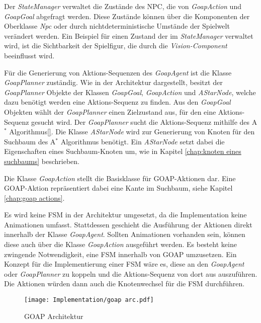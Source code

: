 Der \textit{StateManager} verwaltet die Zustände des NPC, die von \textit{GoapAction} und \textit{GoapGoal} abgefragt werden. Diese Zustände können über die Komponenten der Oberklasse \textit{Npc} oder durch nichtdeterministische Umstände der Spielwelt verändert werden. Ein Beispiel für einen Zustand der im \textit{StateManager} verwaltet wird, ist die Sichtbarkeit der Spielfigur, die durch die \textit{Vision-Component} beeinflusst wird.

Für die Generierung von Aktions-Sequenzen des \textit{GoapAgent} ist die Klasse \textit{GoapPlanner} zuständig. Wie in der Architektur dargestellt, besitzt der \textit{GoapPlanner} Objekte der Klassen \textit{GoapGoal}, \textit{GoapAction} und \textit{AStarNode}, welche dazu benötigt werden eine Aktions-Sequenz zu finden. Aus den \textit{GoapGoal} Objekten wählt der \textit{GoapPlanner} einen Zielzustand aus, für den eine Aktions-Sequenz gesucht wird. Der \textit{GoapPlanner} sucht die Aktions-Sequenz mithilfe des A$^*$ Algorithmus\ref{}. Die Klasse \textit{AStarNode} wird zur Generierung von Knoten für den Suchbaum des A$^*$ Algorithmus benötigt. Ein \textit{AStarNode} setzt dabei die Eigenschaften eines Suchbaum-Knoten um, wie in Kapitel \ref{chap:knoten eines suchbaums} beschrieben.

Die Klasse \textit{GoapAction} stellt die Basisklasse für GOAP-Aktionen dar. Eine GOAP-Aktion repräsentiert dabei eine Kante im Suchbaum, siehe Kapitel \ref{chap:goap actions}.

Es wird keine FSM in der Architektur umgesetzt, da die Implementation keine Animationen umfasst. Stattdessen geschieht die Ausführung der Aktionen direkt innerhalb der Klasse \textit{GoapAgent}. Sollten Animationen vorhanden sein, können diese auch über die Klasse \textit{GoapAction} ausgeführt werden. Es besteht keine zwingende Notwendigkeit, eine FSM innerhalb von GOAP umzusetzen. Ein Konzept für die Implementierung einer FSM wäre es, diese an den \textit{GoapAgent} oder \textit{GoapPlanner} zu koppeln und die Aktions-Sequenz von dort aus auszuführen. Die Aktionen würden dann auch die Knotenwechsel für die FSM durchführen.

\begin{figure}[h]
  \centering
  \texttt{[image: Implementation/goap arc.pdf]}
	\captionsetup{justification=justified, format=plain}
  \caption{GOAP Architektur}
  \label{fig:GOAP Architektur}
\end{figure}







